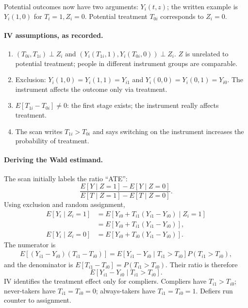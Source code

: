 {Potential outcomes now have two arguments: $Y_i(t,z)$; the written example is $Y_i(1,0)$ for $T_i=1,Z_i=0$. Potential treatment $T_{0i}$ corresponds to $Z_i=0$.
\paragraph{IV assumptions, as recorded.}
\begin{enumerate}
\item $(T_{0i},T_{1i})\perp Z_i$ and $(Y_i(T_{1i},1),Y_i(T_{0i},0))\perp Z_i$. $Z$ is unrelated to potential treatment; people in different instrument groups are comparable.
\item Exclusion: $Y_i(1,0)=Y_i(1,1)=Y_{i1}$ and $Y_i(0,0)=Y_i(0,1)=Y_{i0}$. The instrument affects the outcome only via treatment.
\item $E[T_{1i}-T_{0i}]\ne0$: the first stage exists; the instrument really affects treatment.
\item The scan writes $T_{1i}>T_{0i}$ and says switching on the instrument increases the probability of treatment.
\end{enumerate}

\paragraph{Deriving the Wald estimand.}
The scan initially labels the ratio ``ATE'':
\[\frac{E[Y\mid Z=1]-E[Y\mid Z=0]}{E[T\mid Z=1]-E[T\mid Z=0]}.\]
Using exclusion and random assignment,
\begin{align*}
E[Y_i\mid Z_i=1]&=E[Y_{i0}+T_{i1}(Y_{i1}-Y_{i0})\mid Z_i=1]\\
&=E[Y_{i0}+T_{i1}(Y_{i1}-Y_{i0})],\\
E[Y_i\mid Z_i=0]&=E[Y_{i0}+T_{i0}(Y_{i1}-Y_{i0})].
\end{align*}
The numerator is
\begin{align*}
E[(Y_{i1}-Y_{i0})(T_{i1}-T_{i0})]
=E[Y_{i1}-Y_{i0}\mid T_{i1}>T_{i0}]P(T_{i1}>T_{i0}),
\end{align*}
and the denominator is $E[T_{i1}-T_{i0}]=P(T_{i1}>T_{i0})$. Their ratio is therefore
\[E[Y_{i1}-Y_{i0}\mid T_{i1}>T_{i0}].\]
 IV identifies the treatment effect only for compliers. Compliers have $T_{i1}>T_{i0}$; never-takers have $T_{i1}=T_{i0}=0$; always-takers have $T_{i1}=T_{i0}=1$. Defiers run counter to assignment.

}
